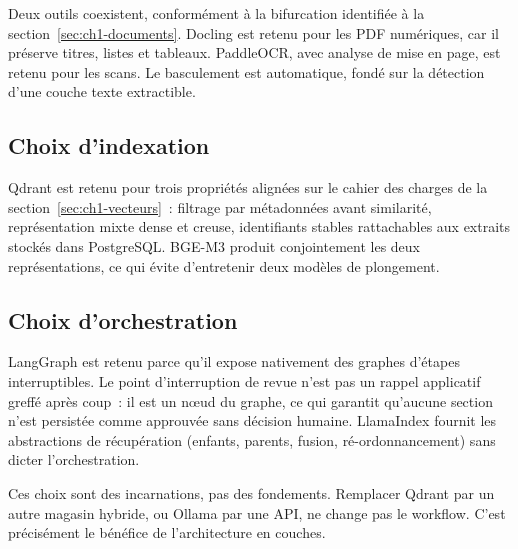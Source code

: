Deux outils coexistent, conformément à la bifurcation identifiée à la
section~\ref{sec:ch1-documents}. Docling est retenu pour les PDF
numériques, car il préserve titres, listes et tableaux. PaddleOCR, avec
analyse de mise en page, est retenu pour les scans. Le basculement est
automatique, fondé sur la détection d'une couche texte extractible.

\subsection{Choix d'indexation}

Qdrant est retenu pour trois propriétés alignées sur le cahier des charges
de la section~\ref{sec:ch1-vecteurs}~: filtrage par métadonnées avant
similarité, représentation mixte dense et creuse, identifiants stables
rattachables aux extraits stockés dans PostgreSQL. BGE-M3 produit
conjointement les deux représentations, ce qui évite d'entretenir deux
modèles de plongement.

\subsection{Choix d'orchestration}

LangGraph est retenu parce qu'il expose nativement des graphes d'étapes
interruptibles. Le point d'interruption de revue n'est pas un rappel
applicatif greffé après coup~: il est un n\oe ud du graphe, ce qui
garantit qu'aucune section n'est persistée comme approuvée sans décision
humaine. LlamaIndex fournit les abstractions de récupération (enfants,
parents, fusion, ré-ordonnancement) sans dicter l'orchestration.

\begin{btpnote}[Substitutabilité]
Ces choix sont des incarnations, pas des fondements. Remplacer Qdrant par
un autre magasin hybride, ou Ollama par une API, ne change pas le
workflow. C'est précisément le bénéfice de l'architecture en couches.
\end{btpnote}
